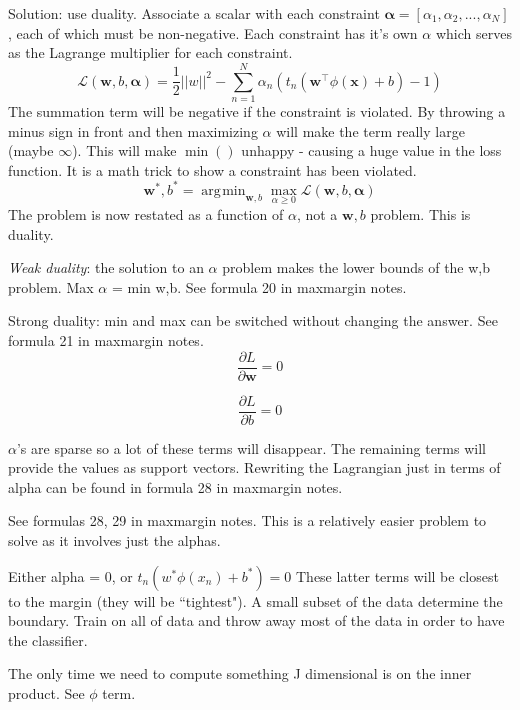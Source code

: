 \documentclass[11pt, oneside]{article}   	%
\DeclareMathOperator*{\argmin}{\arg\!\min}
\begin{document}
Solution: use duality. Associate a scalar with each constraint $\mathbf{\alpha} = [\alpha_1,\alpha_2,...,\alpha_N]$, each of which must be non-negative. Each constraint has it's own $\alpha$  which serves as the Lagrange multiplier for each constraint.
\begin{equation}
\mathcal{L}(\mathbf{w},b,\mathbf{\alpha}) = \frac{1}{2}||w||^2-\sum_{n=1}^N \alpha_n(t_n(\mathbf{w}^\intercal\phi(\mathbf{x})+b ) -1)
\end{equation}
The summation term will be negative if the constraint is violated. By throwing a minus sign in front and then maximizing $\alpha$ will make the term really large (maybe $\infty$). This will make $\min()$ unhappy - causing a huge value in the loss function. It is a math trick to show a constraint has been violated.
\begin{equation}
\mathbf{w}^*,b^*= \argmin_{\mathbf{w},b} \max_{\alpha \ge 0} \mathcal{L}(\mathbf{w},b,\mathbf{\alpha})
\end{equation}
The problem is now restated as a function of $\alpha$, not a $\mathbf{w},b$ problem. This is duality.

\emph{Weak duality}: the solution to an $\alpha$ problem makes the lower bounds of the w,b problem. Max $\alpha$ = min w,b. See formula 20 in maxmargin notes.

Strong duality: min and max can be switched without changing the answer. See formula 21 in maxmargin notes.
\begin{equation}
\frac{\partial L}{\partial \mathbf{w}} = 0 
\end{equation}

\begin{equation}
\frac{\partial L}{\partial b} = 0 
\end{equation}

$\alpha$'s are sparse so a lot of these terms will disappear. The remaining terms will provide the values as support vectors. Rewriting the Lagrangian just in terms of alpha can be found in formula 28 in maxmargin notes.

See formulas 28, 29 in maxmargin notes. This is a relatively easier problem to solve as it involves just the alphas.

Either alpha = 0, or $t_n(w^*\phi(x_n)+b^*) = 0$ These latter terms will be closest to the margin (they will be ``tightest"). A small subset of the data determine the boundary. Train on all of data and throw away most of the data in order to have the classifier.

The only time we need to compute something J dimensional is on the inner product. See $\phi$ term.
\end{document}
